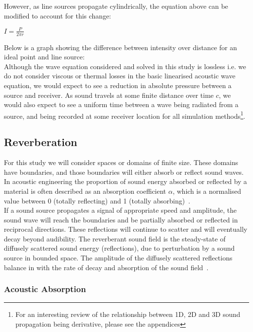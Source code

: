 However, as line sources propagate cylindrically, the equation above can be modified to account for this change:\\
\begin{center}
$I = \frac{P}{2 \pi r}$\\
\end{center}
Below is a graph showing the difference between intensity over distance for an ideal point and line source:\\

Although the wave equation considered and solved in this study is lossless i.e. we do not consider viscous or thermal losses in the basic linearised acoustic wave equation, we would expect to see a reduction in absolute pressure between a source and receiver. As sound travels at some finite distance over time $c$, we would also expect to see a uniform time between a wave being radiated from a source, and being recorded at some receiver location for all simulation methods\footnote{For an interesting review of the relationship between 1D, 2D and 3D sound propagation being derivative, please see the appendices}.\\ 

\subsection{Reverberation}
For this study we will consider spaces or domains of finite size. These domains have boundaries, and those boundaries will either absorb or reflect sound waves. In acoustic engineering the proportion of sound energy absorbed or reflected by a material is often described as an absorption coefficient $\alpha$, which is a normalised value between 0 (totally reflecting) and 1 (totally absorbing)~\cite{beranek1954acoustics}.\\
If a sound source propagates a signal of appropriate speed and amplitude, the sound wave will reach the boundaries and be partially absorbed or reflected in reciprocal directions. These reflections will continue to scatter and will eventually decay beyond audibility. The reverberant sound field is the steady-state of diffusely scattered sound energy (reflections), due to perturbation by a sound source in bounded space. The amplitude of the diffusely scattered reflections balance in with the rate of decay and absorption of the sound field~\cite{Everest2009}.\\ 

\subsubsection{Acoustic Absorption}

